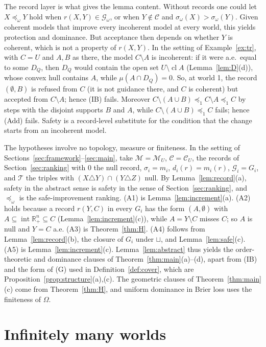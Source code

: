\documentclass[11pt]{article}
\newcommand{\R}{\mathbb{R}}
\newcommand{\M}{\mathcal{M}}
\newcommand{\CC}{\mathcal{C}}
\newcommand{\Rpp}{\inter\R^n_{+}}
\DeclareMathOperator{\cl}{cl}
\DeclareMathOperator{\inter}{int}
\theoremstyle{plain}
\theoremstyle{definition}
\theoremstyle{remark}
\begin{document}
The record layer is what gives the lemma content. Without records one could let
$X\preceq_\omega Y$ hold when $r(X,Y)\in\mathcal G_\omega$, or when $Y\notin\CC$ and
$\sigma_\omega(X)>\sigma_\omega(Y)$. Given coherent models that improve every incoherent
model at every world, this yields protection and dominance. But acceptance then depends on
whether $Y$ is coherent, which is not a property of $r(X,Y)$. In the setting of
Example~\ref{ex:tr}, with $C=U$ and $A,B$ as there, the model $C\setminus A$ is incoherent:
if it were a.e.\ equal to some $D_Q$, then $D_Q$ would contain the open set $U\setminus\cl
A$ (Lemma~\ref{lem:D}(d)), whose convex hull contains $A$, while $\mu(A\cap D_Q)=0$. So, at
world 1, the record $(\emptyset,B)$ is refused from $C$ (it is not guidance there, and $C$
is coherent) but accepted from $C\setminus A$; hence (IB) fails. Moreover $C\setminus(A\cup
B)\preceq_1C\setminus A\preceq_1C$ by steps with the disjoint supports $B$ and $A$, while
$C\setminus(A\cup B)\preceq_1C$ fails; hence (Add) fails. Safety is a record-level
substitute for the condition that the change starts from an incoherent model.

The hypotheses involve no topology, measure or finiteness. In the setting of
Sections~\ref{sec:framework}--\ref{sec:main}, take $\M=\M_U$, $\CC=\CC_U$, the records of
Section~\ref{sec:ranking} with $0$ the null record, $\sigma_i=m_i$, $d_i(r)=m_i(r)$,
$\mathcal G_i=G_i$, and $\mathcal T$ the triples with $(X\triangle Y)\cap(Y\triangle Z)$
null. By Lemma~\ref{lem:record}(a), safety in the abstract sense is safety in the sense of
Section~\ref{sec:ranking}, and $\preceq_\omega$ is the safe-improvement ranking. (A1) is
Lemma~\ref{lem:increment}(a). (A2) holds because a record $r(Y,C)$ in every $G_i$ has the
form $(A,\emptyset)$ with $A\subseteq\Rpp\subseteq C$ (Lemma~\ref{lem:increment}(c)),
while $A=Y\setminus C$ misses $C$; so $A$ is null and $Y=C$ a.e. (A3) is
Theorem~\ref{thm:H}. (A4) follows from Lemma~\ref{lem:record}(b), the closure of $G_i$
under $\sqcup$, and Lemma~\ref{lem:safe}(c). (A5) is Lemma~\ref{lem:increment}(c).
Lemma~\ref{lem:abstract} thus yields the order-theoretic and dominance clauses of
Theorem~\ref{thm:main}(a)--(d), apart from (IB) and the form of (G) used in
Definition~\ref{def:cover}, which are Proposition~\ref{prop:structure}(a),(c). The
geometric clauses of Theorem~\ref{thm:main}(c) come from Theorem~\ref{thm:H}, and uniform
dominance in Brier loss uses the finiteness of $\Omega$.

\section{Infinitely many worlds}\label{sec:infinite}
\end{document}
